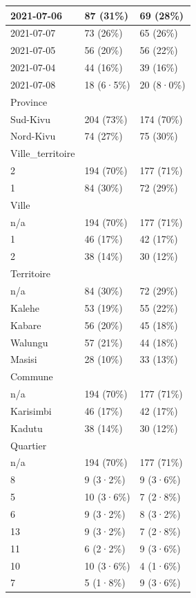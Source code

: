 \documentclass[
]{book}
\begin{document}
\begin{tabular}{l|l|l}
\hline
2021-07-06 & 87 (31\%) & 69 (28\%)\\
\hline
2021-07-07 & 73 (26\%) & 65 (26\%)\\
\hline
2021-07-05 & 56 (20\%) & 56 (22\%)\\
\hline
2021-07-04 & 44 (16\%) & 39 (16\%)\\
\hline
2021-07-08 & 18 (6·5\%) & 20 (8·0\%)\\
\hline
Province &  & \\
\hline
Sud-Kivu & 204 (73\%) & 174 (70\%)\\
\hline
Nord-Kivu & 74 (27\%) & 75 (30\%)\\
\hline
Ville\_territoire &  & \\
\hline
2 & 194 (70\%) & 177 (71\%)\\
\hline
1 & 84 (30\%) & 72 (29\%)\\
\hline
Ville &  & \\
\hline
n/a & 194 (70\%) & 177 (71\%)\\
\hline
1 & 46 (17\%) & 42 (17\%)\\
\hline
2 & 38 (14\%) & 30 (12\%)\\
\hline
Territoire &  & \\
\hline
n/a & 84 (30\%) & 72 (29\%)\\
\hline
Kalehe & 53 (19\%) & 55 (22\%)\\
\hline
Kabare & 56 (20\%) & 45 (18\%)\\
\hline
Walungu & 57 (21\%) & 44 (18\%)\\
\hline
Masisi & 28 (10\%) & 33 (13\%)\\
\hline
Commune &  & \\
\hline
n/a & 194 (70\%) & 177 (71\%)\\
\hline
Karisimbi & 46 (17\%) & 42 (17\%)\\
\hline
Kadutu & 38 (14\%) & 30 (12\%)\\
\hline
Quartier &  & \\
\hline
n/a & 194 (70\%) & 177 (71\%)\\
\hline
8 & 9 (3·2\%) & 9 (3·6\%)\\
\hline
5 & 10 (3·6\%) & 7 (2·8\%)\\
\hline
6 & 9 (3·2\%) & 8 (3·2\%)\\
\hline
13 & 9 (3·2\%) & 7 (2·8\%)\\
\hline
11 & 6 (2·2\%) & 9 (3·6\%)\\
\hline
10 & 10 (3·6\%) & 4 (1·6\%)\\
\hline
7 & 5 (1·8\%) & 9 (3·6\%)\\

\end{tabular}
\end{document}
